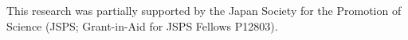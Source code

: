 \documentclass[letterpaper, 10 pt, conference]{ieeeconf}  %
\begin{document}
This research was partially supported by the Japan Society for the
Promotion of Science (JSPS; Grant-in-Aid for JSPS Fellows P12803).





\end{document}
